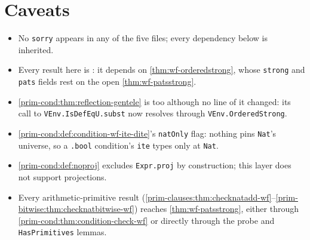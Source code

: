 \section*{Caveats}
\label{sec:prim-arith-contribution}
\label{sec:prim-arith-review}
\begin{itemize}
\item No \texttt{sorry} appears in any of the five files; every dependency below is inherited.
\item Every result here is \stTainted{}: it depends on \ref{thm:wf-orderedstrong}, whose
  \texttt{strong} and \texttt{pats} fields rest on the open \ref{thm:wf-patsstrong}.
\item \ref{prim-cond:thm:reflection-gentele} is \stTainted{} too although no line of it changed:
  its call to \texttt{VEnv.IsDefEqU.subst} now resolves through \texttt{VEnv.OrderedStrong}.
\item \ref{prim-cond:def:condition-wf-ite-dite}'s \texttt{natOnly} flag: nothing pins
  \texttt{Nat}'s universe, so a \texttt{.bool} condition's \texttt{ite} types only at \texttt{Nat}.
\item \ref{prim-cond:def:noproj} excludes \texttt{Expr.proj} by construction; this layer does not
  support projections.
\item Every arithmetic-primitive result (\ref{prim-clauses:thm:checknatadd-wf}--\ref{prim-bitwise:thm:checknatbitwise-wf})
  reaches \ref{thm:wf-patsstrong}, either through \ref{prim-cond:thm:condition-check-wf} or
  directly through the probe and \texttt{HasPrimitives} lemmas.
\end{itemize}
